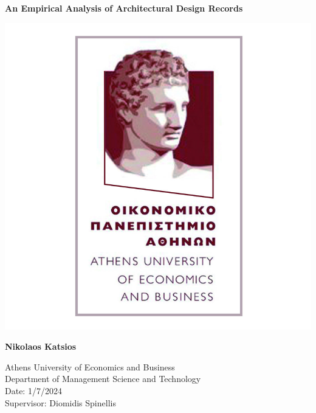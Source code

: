 \begin{titlepage}
    \begin{center}
        \vspace*{1cm}
            
        \Huge
        \textbf{An Empirical Analysis of Architectural Design Records}
            
        \vspace{0.5cm}

        \includegraphics[scale=0.5]{figures/athens_university_logo.png}
            
        \vspace{1.5cm}
            
        \textbf{Nikolaos Katsios}
            
        \vspace{0.8cm}
        
        \Large
        Athens University of Economics and Business \\
        Department of Management Science and Technology\\
        Date: 1/7/2024\\

        \Large
        Supervisor: Diomidis Spinellis
    \end{center}
\end{titlepage}